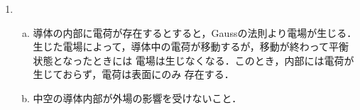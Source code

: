 \begin{enumerate}[label={1.\arabic*}]
  \item 
    \begin{enumerate}[(a)]%
      \item 導体の内部に電荷が存在するとすると，Gaussの法則より電場が生じる．
        生じた電場によって，導体中の電荷が移動するが，移動が終わって平衡状態となったときには
        電場は生じなくなる．このとき，内部には電荷が生じておらず，電荷は表面にのみ
        存在する．
      \item 中空の導体内部が外場の影響を受けないこと．
    \end{enumerate}%
\end{enumerate}
